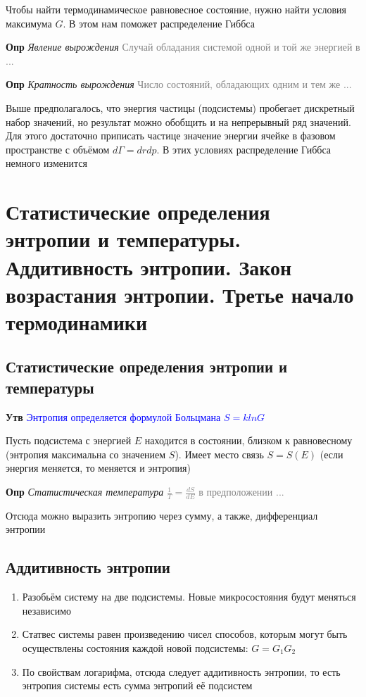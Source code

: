 \documentclass[a4paper, 14pt]{article}
\begin{document}
    Чтобы найти термодинамическое равновесное состояние, нужно найти условия максимума $G$.
    В этом нам поможет распределение Гиббса
    
    \textbf{Опр} \textit{Явление вырождения} \textcolor{gray}{Случай обладания системой одной и той же энергией в ...}
    
    \textbf{Опр} \textit{Кратность вырождения} \textcolor{gray}{Число состояний, обладающих одним и тем же ...}
    
    Выше предполагалось, что энергия частицы (подсистемы) пробегает дискретный набор значений, но результат можно
    обобщить и на непрерывный ряд значений.
    Для этого достаточно приписать частице значение энергии ячейке в фазовом пространстве с объёмом $d\Gamma = dr dp$.
    В этих условиях распределение Гиббса немного изменится
    
    \section{Статистические определения энтропии и температуры.
    Аддитивность энтропии.
    Закон возрастания энтропии.
    Третье начало термодинамики}
    
    \subsection{Статистические определения энтропии и температуры}
    
    \textbf{Утв} \textcolor{blue}{Энтропия определяется формулой Больцмана $S = klnG$}
    
    Пусть подсистема с энергией $E$ находится в состоянии, близком к равновесному (энтропия максимальна со значением $S$).
    Имеет место связь $S = S(E)$ (если энергия меняется, то меняется и энтропия)
    
    \textbf{Опр} \textit{Статистическая температура} \textcolor{gray}{$\frac{1}{T} = \frac{dS}{dE}$ в предположении ...}
    
    Отсюда можно выразить энтропию через сумму, а также, дифференциал энтропии
    
    \subsection{Аддитивность энтропии}
    
    \begin{enumerate}
        \item Разобьём систему на две подсистемы.
        Новые микросостояния будут меняться независимо
        \item Статвес системы равен произведению чисел способов, которым могут быть осуществлены состояния каждой
        новой подсистемы: $G = G_1 G_2$
        \item По свойствам логарифма, отсюда следует аддитивность энтропии, то есть энтропия системы есть сумма
        энтропий её подсистем
    \end{enumerate}
    
\end{document}
